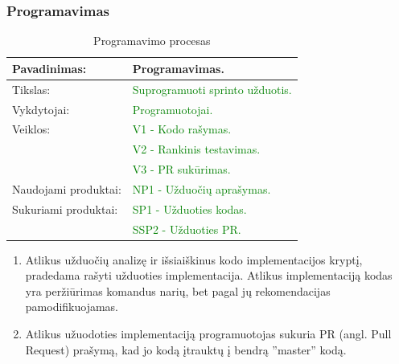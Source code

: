 \documentclass{VUMIFPSkursinis}
\begin{document}
	\subsubsection{Programavimas}
	\begin{center}
		\begin{table}[ht]
			\caption{Programavimo procesas}
			\begin{tabular}{ | l | l | }
				\hline
				Pavadinimas:         & Programavimas.                                     \\ \hline
				Tikslas:             & \textcolor{green}{Suprogramuoti sprinto užduotis.}	\\ \hline
				Vykdytojai:          & \textcolor{green}{Programuotojai.}                 \\ \hline
				Veiklos:             & \textcolor{green}{V1 - Kodo rašymas.}              \\
				                     & \textcolor{green}{V2 - Rankinis testavimas.}       \\
				                     & \textcolor{green}{V3 - PR sukūrimas.}              \\ \hline
				Naudojami produktai: & \textcolor{green}{NP1 - Užduočių aprašymas.}       \\ \hline
				Sukuriami produktai: & \textcolor{green}{SP1 - Užduoties kodas.}          \\
				                     & \textcolor{green}{SSP2 - Užduoties PR.}            \\ \hline
			\end{tabular}
		\end{table}
	\end{center}
		\begin{enumerate}
			\item{
				Atlikus užduočių analizę ir išsiaiškinus kodo implementacijos kryptį, pradedama rašyti užduoties implementacija.
				Atlikus implementaciją kodas yra peržiūrimas komandus narių, bet pagal jų rekomendacijas pamodifikuojamas.
			}
			\item{Atlikus užuodoties implementaciją programuotojas sukuria PR (angl. Pull Request) prašymą, kad jo kodą įtrauktų į bendrą ''master'' kodą.}
		\end{enumerate}
\end{document}
